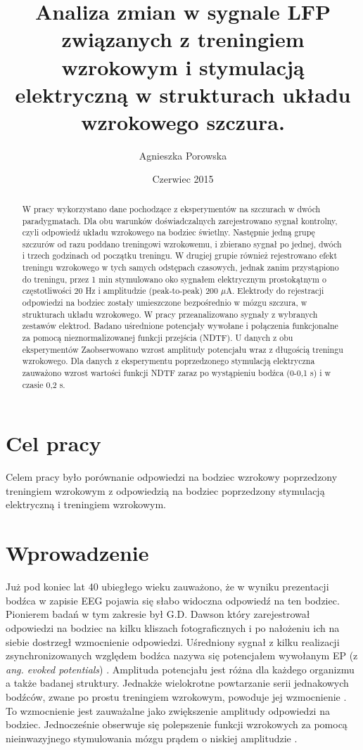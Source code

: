 \documentclass{pracamgr_2}
\author{Agnieszka Porowska}
\title{Analiza zmian w sygnale LFP związanych z treningiem wzrokowym i stymulacją elektryczną w strukturach układu wzrokowego szczura.}
\date{Czerwiec 2015}
\begin{document}
\maketitle

\begin{abstract}
W pracy wykorzystano dane pochodzące z eksperymentów na szczurach w dwóch paradygmatach. Dla obu warunków doświadczalnych zarejestrowano sygnał kontrolny, czyli odpowiedź układu wzrokowego na bodziec świetlny. Następnie jedną grupę szczurów od razu poddano treningowi wzrokowemu, i zbierano sygnał po jednej, dwóch i trzech godzinach od początku treningu. W drugiej grupie również rejestrowano efekt treningu wzrokowego w tych samych odstępach czasowych, jednak zanim przystąpiono do treningu, przez 1 min stymulowano oko sygnałem elektrycznym prostokątnym o częstotliwości 20 Hz i amplitudzie (peak-to-peak) 200 $\mu$A. Elektrody do rejestracji odpowiedzi na bodziec zostały umieszczone bezpośrednio w mózgu szczura, w strukturach układu wzrokowego. W pracy przeanalizowano sygnały z wybranych zestawów elektrod. Badano uśrednione potencjały wywołane i połączenia funkcjonalne za pomocą nieznormalizowanej funkcji przejścia (NDTF). U danych z obu eksperymentów Zaobserwowano wzrost amplitudy potencjału wraz z długością treningu wzrokowego. Dla danych z eksperymentu poprzedzonego stymulacją elektryczna zauważono wzrost wartości funkcji NDTF zaraz po wystąpieniu bodźca (0-0,1 s) i w czasie 0,2 s. 
\end{abstract}

\tableofcontents
\chapter*{Cel pracy}
Celem pracy było porównanie odpowiedzi na bodziec wzrokowy poprzedzony treningiem wzrokowym z odpowiedzią na bodziec poprzedzony stymulacją elektryczną i treningiem wzrokowym.
\chapter{Wprowadzenie}
Już pod koniec lat 40 ubiegłego wieku zauważono, że w wyniku prezentacji bodźca w zapisie EEG pojawia się słabo widoczna odpowiedź na ten bodziec.  Pionierem badań w tym zakresie był G.D. Dawson który zarejestrował odpowiedzi na bodziec na kilku kliszach fotograficznych i po nałożeniu ich na siebie dostrzegł  wzmocnienie odpowiedzi. Uśredniony sygnał z kilku realizacji zsynchronizowanych względem bodźca nazywa się potencjałem wywołanym EP (z \textit{ang. evoked potentials}) \citep{nieder}. Amplituda potencjału jest różna dla każdego organizmu a także badanej struktury. Jednakże  wielokrotne powtarzanie serii jednakowych bodźców, zwane po prostu treningiem wzrokowym, powoduje jej wzmocnienie \citep{hager}. To wzmocnienie jest zauważalne jako zwiększenie amplitudy odpowiedzi na bodziec. Jednocześnie obserwuje się polepszenie funkcji wzrokowych za pomocą nieinwazyjnego stymulowania mózgu prądem o niskiej amplitudzie \citep{schulz}. 
\end{document}
